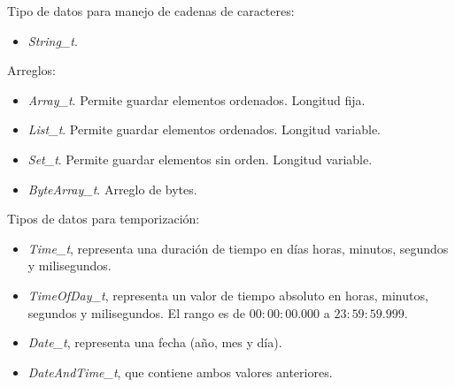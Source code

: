 Tipo de datos para manejo de cadenas de caracteres:

\begin{itemize}
\item
\emph{String\_t}.
\end{itemize}

Arreglos:

\begin{itemize}
\item
\emph{Array\_t}. Permite guardar elementos ordenados. Longitud fija.
\item
\emph{List\_t}. Permite guardar elementos ordenados. Longitud variable.
\item
\emph{Set\_t}. Permite guardar elementos sin orden. Longitud variable.
\item
\emph{ByteArray\_t}. Arreglo de bytes.
\end{itemize}




Tipos de datos para temporización:

\begin{itemize}
\item
\emph{Time\_t}, representa una duración de tiempo en días horas, minutos, segundos y milisegundos.
\item
\emph{TimeOfDay\_t}, representa un valor de tiempo absoluto en horas, minutos, segundos y milisegundos. El rango es de $00:00:00.000$ a $23:59:59.999$.
\item
\emph{Date\_t}, representa una fecha (año, mes y día).
\item
\emph{DateAndTime\_t}, que contiene ambos valores anteriores.
\end{itemize}

